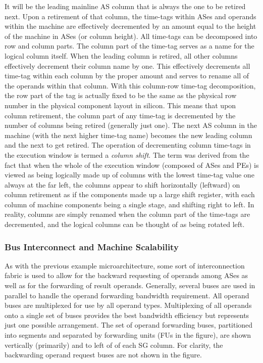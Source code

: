 \documentclass{book}
\begin{document}
It will be the leading mainline AS column that is always the one
to be retired next.
Upon a retirement of that column, the time-tags within ASes and
operands within the machine are effectively decremented by an amount equal
to the height of the machine in ASes (or column height).
All time-tags can be decomposed into row and 
column parts.  The column part of the time-tag serves as a name
for the logical column itself.
When the leading column is retired, all other columns effectively
decrement their column name by one.  This effectively decrements
all time-tag within each column by the proper amount and
serves to rename
all of the operands within that column.
With this column-row time-tag decomposition, the row part of the tag
is actually fixed to be the same as the physical row number in
the physical component layout in silicon.
This means that upon column retirement, the column part of any
time-tag is decremented by the number of columns being retired
(generally just one).
The next AS column in the machine (with the next higher time-tag name)
becomes the new leading column and the next to get retired.
The operation of decrementing column time-tags 
in the execution window is termed a \textit{column shift}.
The term was derived from the fact that 
when the whole of the execution window
(composed of ASes and PEs)
is viewed as being logically made up of columns with the
lowest time-tag value one always at the far left,
the columns
appear to shift horizontally (leftward) on column retirement
as if the components made up a large shift register,
with each column of machine components being a single stage, and shifting
right to left.  In reality, 
columns are simply renamed when the column part of the time-tags
are decremented, and the logical columns can be thought of as being
rotated left.  
%
%
\subsubsection{Bus Interconnect and Machine Scalability}
%
As with the previous example microarchitecture, some sort
of interconnection fabric is used to allow for the
backward requesting of operands among ASes as well
as for the forwarding of result operands.
Generally, several buses are used in parallel to handle the
operand forwarding bandwidth requirement.
All operand buses are multiplexed for use by all operand types.
Multiplexing of all operands onto a single set of buses
provides the best bandwidth efficiency but represents just one possible
arrangement.  The set of operand forwarding buses, partitioned
into segments and separated by forwarding units (FUs in the
figure), are shown
vertically (primarily) and to left of of each SG column.
For clarity,
the backwarding operand request buses are not shown in the figure.
\end{document}
